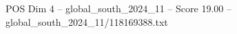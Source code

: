 \begin{textsample}{POS Dim 4 – global\_south\_2024\_11 – Score 19.00 – global\_south\_2024\_11/118169388.txt}
\end{textsample}
